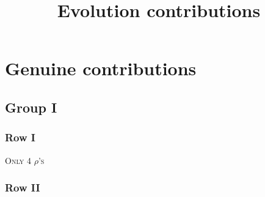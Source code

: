 \documentclass[9pt]{article}
\title{Evolution contributions}
\author{}
\date{}
\numberwithin{equation}{section}
\begin{document}
\maketitle
\section{Genuine contributions}
\subsection{Group I}
\subsubsection{Row I}
\textsc{Only 4 $\rho$'s}
\subsubsection{Row II}
\end{document}
